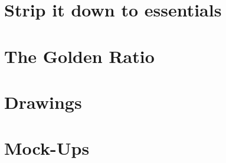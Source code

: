 \section{Strip it down to essentials}\label{sec:design-essentials}


\section{The Golden Ratio}\label{sec:golden-ratio}


\section{Drawings}\label{sec:drawings}


\section{Mock-Ups}\label{sec:design-mockups}
